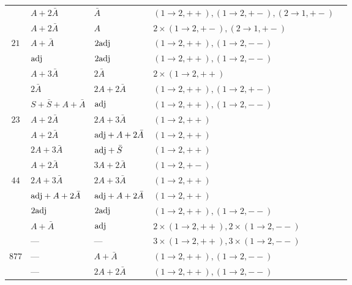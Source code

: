 \begin{table}[h]
\begin{tabular}{cllll}
         & $A+2\bar A$                 & $\bar A$                  & $(1\!\to\!2,++),(1\!\to\!2,+-),(2\!\to\!1,+-)$ \\
         & $A+2\bar A$                 & $A$                       & $2\!\times\!(1\!\to\!2,+-),(2\!\to\!1,+-)$ \\
    \midrule
    $21$ & $A+\bar A$                  & $2\mathrm{adj}$                   & $(1\!\to\!2,++),(1\!\to\!2,--)$ \\
         & $\mathrm{adj}$                      & $2\mathrm{adj}$                   & $(1\!\to\!2,++),(1\!\to\!2,--)$ \\
         & $A+3\bar A$                 & $2\bar A$                 & $2\!\times\!(1\!\to\!2,++)$ \\
         & $2\bar A$                   & $2A+2\bar A$              & $(1\!\to\!2,++),(1\!\to\!2,+-)$ \\
         & $S+\bar S+A+\bar A$         & $\mathrm{adj}$                    & $(1\!\to\!2,++),(1\!\to\!2,--)$ \\
    \midrule
    $23$ & $A+2\bar A$                 & $2A+3\bar A$              & $(1\!\to\!2,++)$ \\
         & $A+2\bar A$                 & $\mathrm{adj}+A+2\bar A$          & $(1\!\to\!2,++)$ \\
         & $2A+3\bar A$                & $\mathrm{adj}+\bar S$             & $(1\!\to\!2,++)$ \\
         & $A+2\bar A$                 & $3A+2\bar A$              & $(1\!\to\!2,+-)$ \\
    \midrule
    $44$ & $2A+3\bar A$                & $2A+3\bar A$              & $(1\!\to\!2,++)$ \\
         & $\mathrm{adj}+A+2\bar A$            & $\mathrm{adj}+A+2\bar A$          & $(1\!\to\!2,++)$ \\
         & $2\mathrm{adj}$                     & $2\mathrm{adj}$                   & $(1\!\to\!2,++),(1\!\to\!2,--)$ \\
         & $A+\bar A$                  & $\mathrm{adj}$                    & $2\!\times\!(1\!\to\!2,++),2\!\times\!(1\!\to\!2,--)$ \\
         & ---                         & ---                       & $3\!\times\!(1\!\to\!2,++),3\!\times\!(1\!\to\!2,--)$ \\
    \midrule
    $877$& ---                         & $A+\bar A$                & $(1\!\to\!2,++),(1\!\to\!2,--)$ \\
         & ---                         & $2A+2\bar A$              & $(1\!\to\!2,++),(1\!\to\!2,--)$ \\

\end{tabular}
\end{table}
